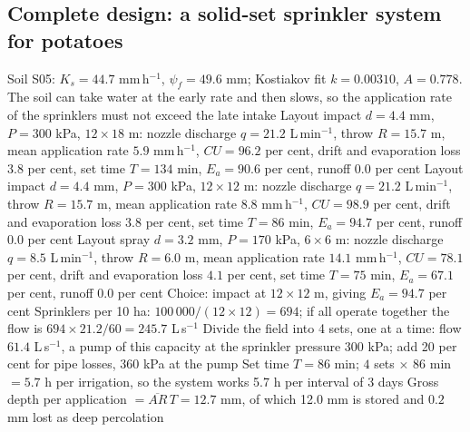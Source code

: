 \subsection{Complete design: a solid-set sprinkler system for potatoes}
\sol
\ans Soil S05: $K_s=44.7$ mm\,h$^{-1}$, $\psi_f=49.6$ mm; Kostiakov fit $k=0.00310$, $A=0.778$. The soil can take water at the early rate and then slows, so the application rate of the sprinklers must not exceed the late intake
\ans Layout impact $d=4.4$ mm, $P=300$ kPa, $12\times18$ m: nozzle discharge $q=21.2$ L\,min$^{-1}$, throw $R=15.7$ m, mean application rate $5.9$ mm\,h$^{-1}$, $CU=96.2$ per cent, drift and evaporation loss $3.8$ per cent, set time $T=134$ min, $E_a=90.6$ per cent, runoff 0.0 per cent
\ans Layout impact $d=4.4$ mm, $P=300$ kPa, $12\times12$ m: nozzle discharge $q=21.2$ L\,min$^{-1}$, throw $R=15.7$ m, mean application rate $8.8$ mm\,h$^{-1}$, $CU=98.9$ per cent, drift and evaporation loss $3.8$ per cent, set time $T=86$ min, $E_a=94.7$ per cent, runoff 0.0 per cent
\ans Layout spray $d=3.2$ mm, $P=170$ kPa, $6\times6$ m: nozzle discharge $q=8.5$ L\,min$^{-1}$, throw $R=6.0$ m, mean application rate $14.1$ mm\,h$^{-1}$, $CU=78.1$ per cent, drift and evaporation loss $4.1$ per cent, set time $T=75$ min, $E_a=67.1$ per cent, runoff 0.0 per cent
\ans Choice: impact at $12\times12$ m, giving $E_a=94.7$ per cent
\ans Sprinklers per 10 ha: $100\,000/(12\times12)=694$; if all operate together the flow is $694\times21.2/60=245.7$ L\,s$^{-1}$
\ans Divide the field into 4 sets, one at a time: flow $61.4$ L\,s$^{-1}$, a pump of this capacity at the sprinkler pressure $300$ kPa; add 20 per cent for pipe losses, $360$ kPa at the pump
\ans Set time $T=86$ min; $4$ sets $\times$ $86$ min $=5.7$ h per irrigation, so the system works 5.7 h per interval of 3 days
\ans Gross depth per application $=\overline{AR}\,T=12.7$ mm, of which 12.0 mm is stored and $0.2$ mm lost as deep percolation \finans


